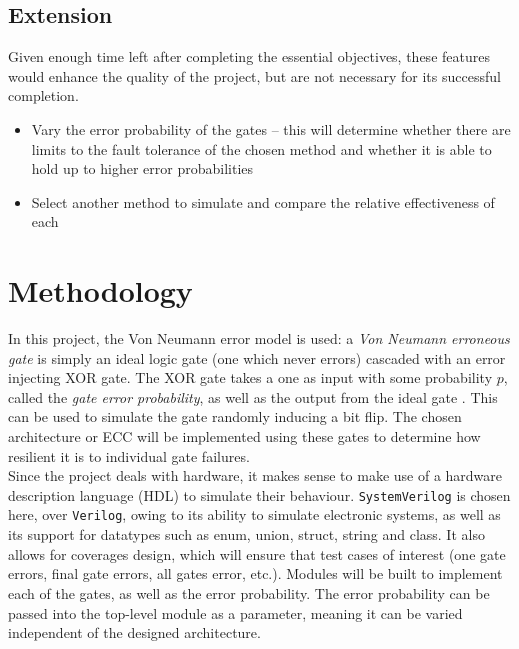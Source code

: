 \documentclass[12pt,a4paper]{article}
\begin{document}
\subsection{Extension}
Given enough time left after completing the essential objectives, these features would enhance the quality of the 
project, but are not necessary for its successful completion.
\begin{itemize}
    \item Vary the error probability of the gates -- this will determine whether there are limits to the fault 
    tolerance of the chosen method and whether it is able to hold up to higher error probabilities
    \item Select another method to simulate and compare the relative effectiveness of each
\end{itemize}


\section{Methodology} \label{sec:meth}
In this project, the Von Neumann error model is used: a \emph{Von Neumann erroneous gate} is simply an ideal logic 
gate (one which never errors) cascaded with an error injecting XOR gate. The XOR gate takes a one as input with some 
probability $p$, called the \emph{gate error probability}, as well as the output from the ideal gate \cite{ref2}. 
This can be used to simulate the gate randomly inducing a bit flip. The chosen architecture or ECC will be 
implemented using these gates to determine how resilient it is to individual gate failures. \\

\noindent Since the project deals with hardware, it makes sense to make use of a hardware description language (HDL) to 
simulate their behaviour. \texttt{SystemVerilog} is chosen here, over \texttt{Verilog}, owing to its ability to 
simulate electronic systems, as well as its support for datatypes such as enum, union, struct, string and class. It 
also allows for coverages design, which will ensure that test cases of interest (one gate errors, final gate errors, 
all gates error, etc.). Modules will be built to implement each of the gates, as well as the error probability. The 
error probability can be passed into the top-level module as a parameter, meaning it can be varied independent of 
the designed architecture. \\
\end{document}

